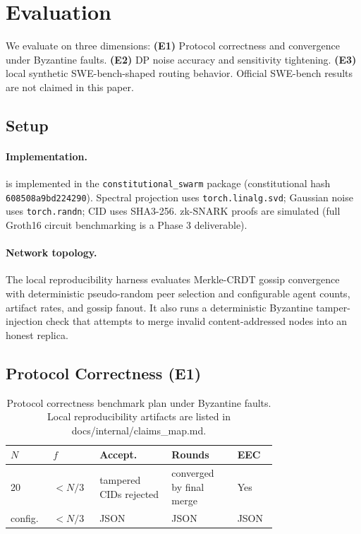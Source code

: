 \section{Evaluation}
\label{sec:evaluation}

We evaluate \fedsink{} on three dimensions:
\textbf{(E1)} Protocol correctness and convergence under Byzantine faults.
\textbf{(E2)} DP noise accuracy and sensitivity tightening.
\textbf{(E3)} local synthetic SWE-bench-shaped routing behavior.  Official SWE-bench
results are not claimed in this paper.

\subsection{Setup}

\paragraph{Implementation.}
\fedsink{} is implemented in the \texttt{constitutional\_swarm} package
(constitutional hash \texttt{608508a9bd224290}).
Spectral projection uses \texttt{torch.linalg.svd}; Gaussian noise uses
\texttt{torch.randn}; CID uses SHA3-256.  zk-SNARK proofs are simulated (full
Groth16 circuit benchmarking is a Phase 3 deliverable).

\paragraph{Network topology.}
The local reproducibility harness evaluates Merkle-CRDT gossip convergence with
deterministic pseudo-random peer selection and configurable agent counts, artifact
rates, and gossip fanout.  It also runs a deterministic Byzantine tamper-injection
check that attempts to merge invalid content-addressed nodes into an honest replica.

\subsection{Protocol Correctness (E1)}

\begin{table}[t]
  \centering
  \footnotesize
  \caption{Protocol correctness benchmark plan under Byzantine faults.
    Local reproducibility artifacts are listed in docs/internal/claims\_map.md.}
  \label{tab:protocol_correctness}
  \renewcommand{\arraystretch}{1.1}
  \begin{tabular}{@{}p{0.10\linewidth}p{0.12\linewidth}p{0.23\linewidth}p{0.21\linewidth}p{0.09\linewidth}@{}}
    \toprule
    $N$ & $f$ & Accept. & Rounds & EEC \\
    \midrule
    20 & $<N/3$ & tampered CIDs rejected & converged by final merge & Yes \\
    config. & $<N/3$ & JSON & JSON & JSON \\
    \bottomrule
  \end{tabular}
\end{table}

